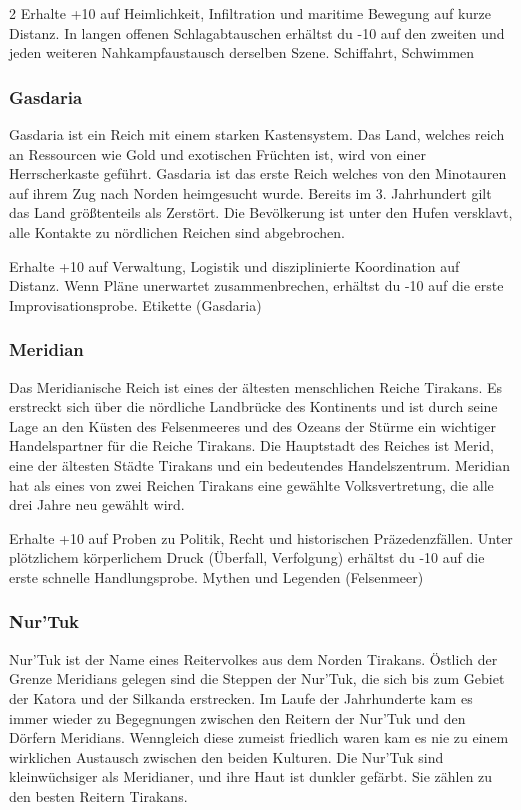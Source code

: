 {\begin{multicols*}{2}
        \abstammungspielwertebox
        {Erhalte +10 auf Heimlichkeit, Infiltration und maritime Bewegung auf kurze Distanz.}
        {In langen offenen Schlagabtauschen erhältst du -10 auf den zweiten und jeden weiteren Nahkampfaustausch derselben Szene.}
        {Schiffahrt, Schwimmen}

        \subsubsection*{Gasdaria}
        Gasdaria ist ein Reich mit einem starken Kastensystem. Das Land, welches reich an Ressourcen wie Gold und exotischen Früchten ist, wird von einer Herrscherkaste geführt. Gasdaria ist das erste Reich welches von den Minotauren auf ihrem Zug nach Norden heimgesucht wurde. Bereits im 3. Jahrhundert gilt das Land größtenteils als Zerstört. Die Bevölkerung ist unter den Hufen versklavt, alle Kontakte zu nördlichen Reichen sind abgebrochen.

        \abstammungspielwertebox
        {Erhalte +10 auf Verwaltung, Logistik und disziplinierte Koordination auf Distanz.}
        {Wenn Pläne unerwartet zusammenbrechen, erhältst du -10 auf die erste Improvisationsprobe.}
        {Etikette (Gasdaria)}

        \subsubsection*{Meridian}
        Das Meridianische Reich ist eines der ältesten menschlichen Reiche Tirakans. Es erstreckt sich über die nördliche Landbrücke des Kontinents und ist durch seine Lage an den Küsten des Felsenmeeres und des Ozeans der Stürme ein wichtiger Handelspartner für die Reiche Tirakans. Die Hauptstadt des Reiches ist Merid, eine der ältesten Städte Tirakans und ein bedeutendes Handelszentrum. Meridian hat als eines von zwei Reichen Tirakans eine gewählte Volksvertretung, die alle drei Jahre neu gewählt wird.

        \abstammungspielwertebox
        {Erhalte +10 auf Proben zu Politik, Recht und historischen Präzedenzfällen.}
        {Unter plötzlichem körperlichem Druck (Überfall, Verfolgung) erhältst du -10 auf die erste schnelle Handlungsprobe.}
        {Mythen und Legenden (Felsenmeer)}

        \subsubsection*{Nur'Tuk}
        Nur'Tuk ist der Name eines Reitervolkes aus dem Norden Tirakans. Östlich der Grenze Meridians gelegen sind die Steppen der Nur'Tuk, die sich bis zum Gebiet der Katora und der Silkanda erstrecken. Im Laufe der Jahrhunderte kam es immer wieder zu Begegnungen zwischen den Reitern der Nur'Tuk und den Dörfern Meridians. Wenngleich diese zumeist friedlich waren kam es nie zu einem wirklichen Austausch zwischen den beiden Kulturen. Die Nur'Tuk sind kleinwüchsiger als Meridianer, und ihre Haut ist dunkler gefärbt. Sie zählen zu den besten Reitern Tirakans.


\end{multicols*}}
